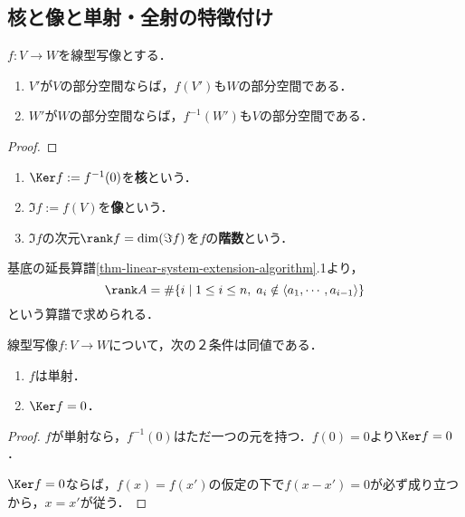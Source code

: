 \documentclass[uplatex, dvipdfmx]{jsreport}
\begin{document}
\subsection{核と像と単射・全射の特徴付け}

\begin{proposition}
    $f:V\to W$を線型写像とする．
    \begin{enumerate}
        \item $V'$が$V$の部分空間ならば，$f(V')$も$W$の部分空間である．
        \item $W'$が$W$の部分空間ならば，$f^{-1}(W')$も$V$の部分空間である．
    \end{enumerate}
\end{proposition}
\begin{proof}
    
\end{proof}

\begin{definition}\mbox{}
    \begin{enumerate}
        \item $\Ker f:=f^{-1}(0)$を\textbf{核}という．
        \item $\Im f:=f(V)$を\textbf{像}という．
        \item $\Im f$の次元$\rank f=\dim(\Im f)$を$f$の\textbf{階数}という．
    \end{enumerate}
\end{definition}
\begin{corollary}
    基底の延長算譜\ref{thm-linear-system-extension-algorithm}.1より，
    \[ \rank A=\#\{i\mid 1\le i\le n,\;a_i\notin\langle a_1,\cdots,a_{i-1}\rangle\} \]
    という算譜で求められる．
\end{corollary}

\begin{proposition}[単射の特徴付け]\label{prop-characterization-of-monos-in-terms-of-Kernel}
    線型写像$f:V\to W$について，次の２条件は同値である．
    \begin{enumerate}
        \item $f$は単射．
        \item $\Ker f=0$．
    \end{enumerate}
\end{proposition}
\begin{proof}
    $f$が単射なら，$f^{-1}(0)$はただ一つの元を持つ．$f(0)=0$より$\Ker f=0$．

    $\Ker f=0$ならば，$f(x)=f(x')$の仮定の下で$f(x-x')=0$が必ず成り立つから，$x=x'$が従う．
\end{proof}
\end{document}
